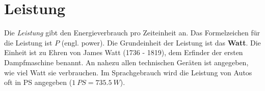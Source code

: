 \documentclass[12pt,a4paper,twoside]{article}
\begin{document}
%
%
%
%
%
%
%
%
%
%
%

\newpage
\section*{Leistung}
Die \emph{Leistung} gibt den Energieverbrauch pro Zeiteinheit an. Das Formelzeichen 
für die Leistung ist $P$ (engl. power). Die Grundeinheit der Leistung ist das {\bf Watt}.
Die Einheit ist zu Ehren von James Watt (1736 - 1819), dem Erfinder der ersten Dampfmaschine benannt.
An nahezu allen technischen Geräten ist angegeben, wie viel Watt sie verbrauchen.
Im Sprachgebrauch wird die Leistung von Autos oft in PS angegeben (\(\SI{1}{PS}= \SI{735.5}{W}\)).
\end{document}

